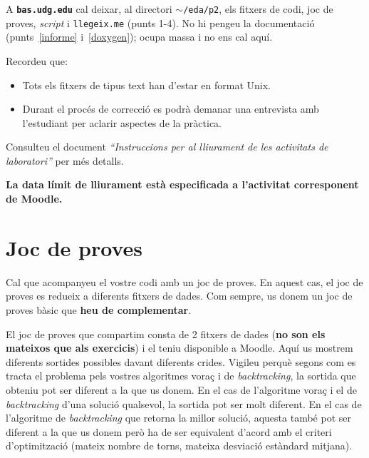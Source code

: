 \documentclass[10pt,a4paper]{../documents/class_material_assignatura_udg}
\begin{document}
\bigskip

\noindent A \textbf{\texttt{bas.udg.edu}} cal deixar, al directori \texttt{$\sim$/eda/p2}, els fitxers de codi, joc de proves, \textit{script} i \texttt{llegeix.me} (punts 1-4). No hi pengeu la documentació (punts~\ref{informe} i~\ref{doxygen}); ocupa massa i no ens cal aquí.

\bigskip

Recordeu que:

\begin{itemize}
    \item Tots els fitxers de tipus text han d'estar en format Unix.
    
    \item Durant el procés de correcció es podrà demanar una entrevista amb l'estudiant per aclarir aspectes de la pràctica.
\end{itemize}

Consulteu el document \textit{``Instruccions per al lliurament de les activitats de laboratori''} per més detalls.

\bigskip

\textbf{La data límit de lliurament està especificada a l'activitat corresponent de Moodle.}

\clearpage


\section{Joc de proves}

Cal que acompanyeu el vostre codi amb un joc de proves. En aquest cas, el joc de proves es redueix a diferents fitxers de dades. Com sempre, us donem un joc de proves bàsic que \textbf{heu de complementar}.

El joc de proves que compartim consta de 2 fitxers de dades (\textcolor{salmo}{\bf no son els mateixos que als exercicis}) i el teniu disponible a Moodle. Aquí us mostrem diferents sortides possibles davant diferents crides. Vigileu perquè segons com es tracta el problema pels vostres algoritmes voraç i de {\it backtracking}, la sortida que obteniu pot ser diferent a la que us donem. En el cas de l'algoritme voraç i el de \textit{backtracking} d'una solució qualsevol, la sortida pot ser molt diferent. En el cas de l'algoritme de \textit{backtracking} que retorna la millor solució, aquesta també pot ser diferent a la que us donem però ha de ser equivalent d'acord amb el criteri d'optimització (mateix nombre de torns, mateixa desviació estàndard mitjana). 
\end{document}
